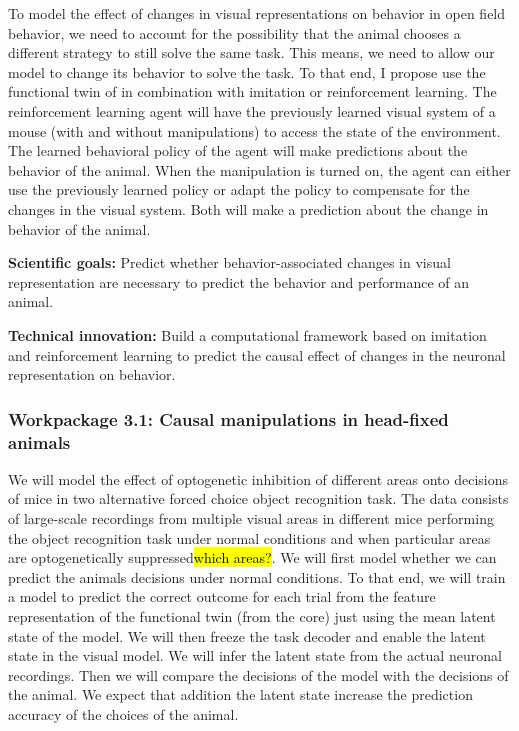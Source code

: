 \documentclass[B2,COG]{ercgrant}
\begin{document}
To model the effect of changes in visual representations on behavior in open field behavior, we need to account for the possibility that the animal chooses a different strategy to still solve the same task. 
This means, we need to allow our model to change its behavior to solve the task. 
To that end, I propose use the functional twin of in combination with imitation or reinforcement learning.
The reinforcement learning agent will have the previously learned visual system of a mouse (with and without manipulations) to access the state of the environment.
The learned behavioral policy of the agent will make predictions about the behavior of the animal. 
When the manipulation is turned on, the agent can either use the previously learned policy or adapt the policy to compensate for the changes in the visual system.
Both will make a prediction about the change in behavior of the animal. 

\textbf{Scientific goals:}  Predict whether behavior-associated changes in visual representation 
are necessary to predict the behavior and performance of an animal. 

\textbf{Technical innovation:} 
Build a computational framework based on imitation and reinforcement learning to predict the causal effect of changes in the neuronal representation on behavior. 

\subsubsection{Workpackage 3.1: Causal manipulations in head-fixed animals\hfill{}}
We will model the effect of optogenetic inhibition of different areas onto decisions of mice in two alternative forced choice object recognition task. 
The data consists of large-scale recordings from multiple visual areas in different mice performing the object recognition task under normal conditions and when particular areas are optogenetically suppressed\hl{which areas?}.
We will first model whether we can predict the animals decisions under normal conditions. 
To that end, we will train a model to predict the correct outcome for each trial from the feature representation of the functional twin (from the core) just using the mean latent state of the model.
We will then freeze the task decoder and enable the latent state in the visual model. 
We will infer the latent state from the actual neuronal recordings.
Then we will compare the decisions of the model with the decisions of the animal. 
We expect that addition the latent state increase the prediction accuracy of the choices of the animal. 
\end{document}

